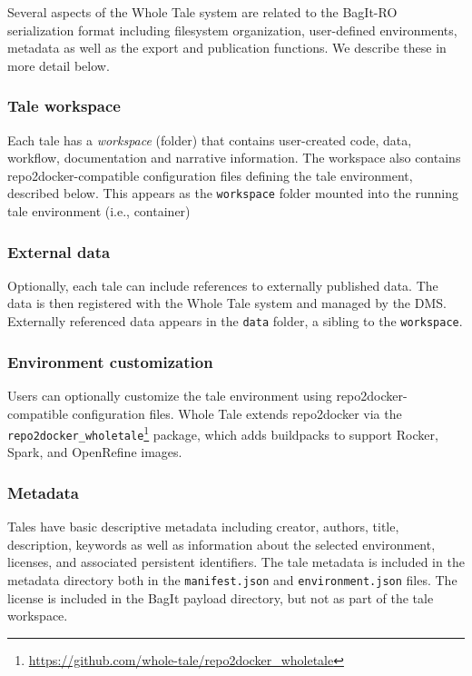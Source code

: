 \documentclass[conference]{IEEEtran}
\begin{document}
Several aspects of the Whole Tale system are related to the BagIt-RO serialization format including filesystem organization, user-defined environments, metadata as well as the export and publication functions. We describe these in more detail below.

\subsubsection{Tale workspace}
Each tale has a \emph{workspace} (folder) that contains user-created code, data, workflow, documentation and narrative information. The workspace also contains repo2docker-compatible configuration files defining the tale environment, described below. This appears as the \texttt{workspace} folder mounted into the running tale environment (i.e., container)

\subsubsection{External data}
Optionally, each tale can include references to externally published data. The data is then registered with the Whole Tale system and managed by the DMS. Externally referenced data appears in the \texttt{data} folder, a sibling to the \texttt{workspace}.

\subsubsection{Environment customization}
Users can optionally customize the tale environment using repo2docker-compatible configuration files. Whole Tale extends repo2docker via the \texttt{repo2docker\_wholetale}\footnote{\url{https://github.com/whole-tale/repo2docker_wholetale}} package, which adds buildpacks to support Rocker, Spark, and OpenRefine images. 

\subsubsection{Metadata}

Tales have basic descriptive metadata including creator, authors, title, description, keywords as well as information about the selected environment, licenses, and associated persistent identifiers. The tale metadata is included in the metadata directory both in the \texttt{manifest.json} and \texttt{environment.json} files.  The license is included in the BagIt payload directory, but not as part of the tale workspace.
\end{document}

